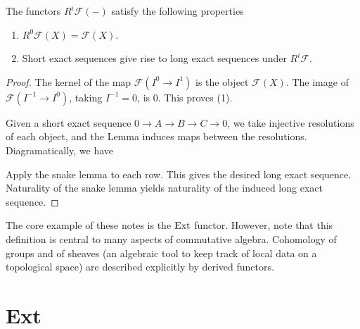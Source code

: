 \begin{theorem}
    The functors $R^i \mathcal{F}({-})$ satisfy the following properties
    \begin{enumerate}
        \item $R^0 \mathcal{F}(X) = \mathcal{F}(X)$.
        \item Short exact sequences give rise to long exact sequences under $R^i
            \mathcal{F}$.
    \end{enumerate}

    \begin{proof}
        The kernel of the map $\mathcal{F}(I^0 \to I^1)$ is the object
        $\mathcal{F}(X)$. The image of $\mathcal{F}(I^{-1} \to I^0)$, taking
        $I^{-1} = 0$, is $0$. This proves (1).

        Given a short exact sequence $0 \to A \to B \to C \to 0$, we take
        injective resolutions of each object, and the Lemma induces maps between
        the resolutions. Diagramatically, we have
        \begin{center}
        \end{center}
        Apply the snake lemma to each row. This gives the desired long exact
        sequence. Naturality of the snake lemma yields naturality of the induced
        long exact sequence.
    \end{proof}
\end{theorem}

\begin{example}
    The core example of these notes is the $\operatorname{Ext}$ functor. However, note that
    this definition is central to many aspects of commutative algebra.
    Cohomology of groups and of sheaves (an algebraic tool to keep track of
    local data on a topological space) are described explicitly by derived
    functors. 
\end{example}

\section{Ext}

